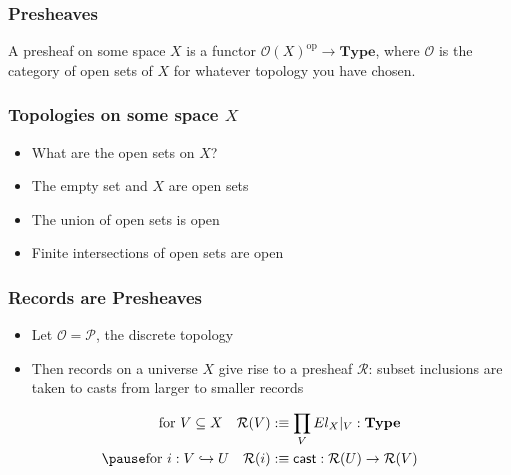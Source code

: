 \documentclass[tikz, 12pt]{beamer}
\begin{document}
\begin{frame}
  \frametitle{Presheaves}\pause

  A presheaf on some space $X$ is a functor
  $\mathcal{O}(X)^{\mathrm{op}}\to\mathbf{Type}$, where $\mathcal{O}$ is the
  category of open sets of $X$ for whatever topology you have chosen.
\end{frame}

\begin{frame}
  \frametitle{Topologies on some space $X$}\pause

  \begin{itemize}
    \item What are the open sets on $X$?\pause
    \item The empty set and $X$ are open sets
    \item The union of open sets is open
    \item Finite intersections of open sets are open
  \end{itemize}
\end{frame}

\begin{frame}
  \frametitle{Records are Presheaves}\pause

  \begin{itemize}
    \item Let $\mathcal{O} = \mathcal{P}$, the discrete topology\pause
    \item Then records on a universe $X$ give rise to a presheaf $\mathcal{R}$: subset inclusions are taken to casts from larger to smaller records
  \end{itemize}
  \pause

  \[
    \begin{aligned}
      \text{for } V\subseteq X\quad \mathcal{R}(V) &:\equiv \prod_V El_X|_V : \mathbf{Type}\\ \pause
      \text{for } i : V\hookrightarrow U\quad \mathcal{R}(i) &:\equiv \mathsf{cast} : \mathcal{R}(U)\to\mathcal{R}(V)
    \end{aligned}
  \]
\end{frame}
\end{document}
